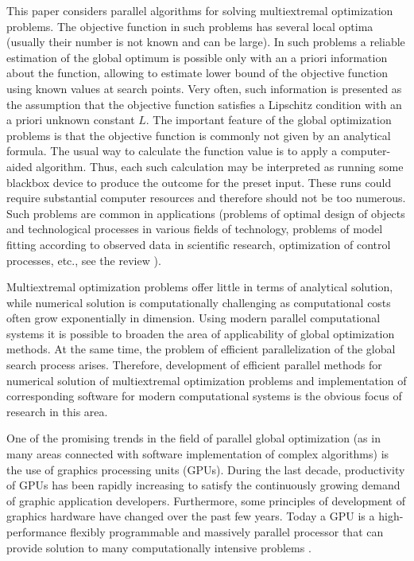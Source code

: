 \documentclass[smallcondensed]{svjour3}     %
\begin{document}
This paper considers parallel algorithms for solving multiextremal optimization problems. The objective function in such problems has several local optima (usually their number is not known and can be large). 
In such problems a reliable estimation of the global optimum is possible only with an a priori information about the function, allowing to estimate lower bound of the objective function using known values at search points. 
Very often, such information is presented as the assumption that the objective function satisfies a Lipschitz condition with an a priori unknown constant $L$. 
The important feature of the global optimization problems is that the objective function is commonly not given by an analytical formula. The usual way to calculate the function value is to apply a computer-aided algorithm. Thus, each such calculation may be interpreted as running some blackbox device  to produce the outcome for the preset input. These runs could require substantial computer resources and therefore should not be too numerous. 
Such problems are common in applications (problems of optimal design of objects and technological processes in various fields of technology, problems of model fitting according to observed data in scientific research, optimization of control processes, etc., see the review \cite{RefPinter}).

Multiextremal optimization problems offer little in terms of analytical solution, while numerical solution is computationally challenging as computational costs often grow exponentially in dimension. Using modern parallel computational systems it is possible to broaden the area of applicability of global optimization methods. At the same time, the problem of efficient parallelization of the global search process arises. Therefore, development of efficient parallel methods for numerical solution of multiextremal optimization problems and implementation of corresponding software for modern computational systems is the obvious focus of research in this area.

One of the promising trends in the field of parallel global optimization (as in many areas connected with software implementation of complex algorithms) is the use of graphics processing units (GPUs). During the last decade, productivity of GPUs has been rapidly increasing to satisfy the continuously growing demand of graphic application developers. Furthermore, some principles of development of graphics hardware have changed over the past few years. Today a GPU is a high-performance flexibly programmable and massively parallel processor that can provide solution to many computationally intensive problems \cite{RefHwu}.
\end{document}
